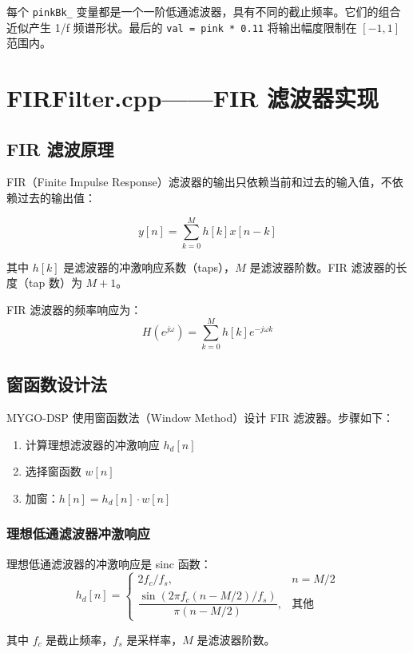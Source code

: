 ﻿\documentclass[12pt,a4paper,oneside]{ctexbook}
\begin{document}
每个 \texttt{pinkBk\_} 变量都是一个一阶低通滤波器，具有不同的截止频率。它们的组合近似产生 1/f 频谱形状。最后的 \texttt{val = pink * 0.11} 将输出幅度限制在 \([-1, 1]\) 范围内。

\clearpage

\section{FIRFilter.cpp——FIR 滤波器实现}

\subsection{FIR 滤波原理}

FIR（Finite Impulse Response）滤波器的输出只依赖当前和过去的输入值，不依赖过去的输出值：

\[
y[n] = \sum_{k=0}^{M} h[k] x[n-k]
\]

其中 \(h[k]\) 是滤波器的冲激响应系数（taps），\(M\) 是滤波器阶数。FIR 滤波器的长度（tap 数）为 \(M+1\)。

FIR 滤波器的频率响应为：
\[
H(e^{j\omega}) = \sum_{k=0}^{M} h[k] e^{-j\omega k}
\]

\subsection{窗函数设计法}

MYGO-DSP 使用窗函数法（Window Method）设计 FIR 滤波器。步骤如下：

\begin{enumerate}
    \item 计算理想滤波器的冲激响应 \(h_d[n]\)
    \item 选择窗函数 \(w[n]\)
    \item 加窗：\(h[n] = h_d[n] \cdot w[n]\)
\end{enumerate}

\subsubsection{理想低通滤波器冲激响应}

理想低通滤波器的冲激响应是 sinc 函数：
\[
h_d[n] = 
\begin{cases}
2 f_c / f_s, & n = M/2 \\
\dfrac{\sin(2\pi f_c (n - M/2) / f_s)}{\pi (n - M/2)}, & \text{其他}
\end{cases}
\]

其中 \(f_c\) 是截止频率，\(f_s\) 是采样率，\(M\) 是滤波器阶数。
\end{document}
